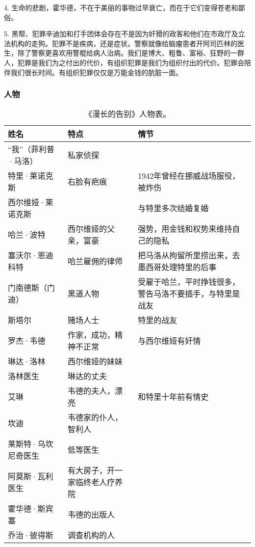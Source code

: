 4. 生命的悲剧，霍华德，不在于美丽的事物过早衰亡，而在于它们变得苍老和鄙俗。

5. 黑帮、犯罪辛迪加和打手团体会存在不是因为奸猾的政客和他们在市政厅及立法机构的走狗。犯罪不是疾病，还是症状。警察就像给脑瘤患者开阿司匹林的医生，除了警察更喜欢用警棍给病人治病。我们是博大、粗鲁、富裕、狂野的一群人，犯罪是我们为之付出的代价，有组织犯罪是我们为组织付出的代价。犯罪会陪伴我们很长时间。有组织犯罪仅仅是万能金钱的肮脏一面。

\subsubsection{人物}


\begin{table}[htpb]
\centering
\caption{《漫长的告别》人物表。}
\begin{tabular}{p{} | p{} | p{}}
姓名 & 特点 & 情节 \\
\hline
“我”（菲利普·马洛） & 私家侦探 &  \\
特里·莱诺克斯 &右脸有疤痕 &1942年曾经在挪威战场服役，被炸伤 \\
西尔维娅·莱诺克斯 & &  与特里多次结婚复婚 \\
哈兰·波特 & 西尔维娅的父亲，富豪 &强势，用金钱和权势来维持自己的隐私 \\
塞沃尔·恩迪科特 & 哈兰雇佣的律师 & 把马洛从拘留所里捞出来，去墨西哥处理特里的后事 \\
门南德斯（门迪） & 黑道人物 & 受雇于哈兰，平时挣钱很多，警告马洛不要插手，与特里是战友 \\
斯塔尔 &赌场人士 & 特里的战友 \\
罗杰·韦德 & 作家，成功，精神不正常&与西尔维娅有奸情 \\
琳达·洛林 & 西尔维娅的妹妹 & \\
洛林医生 & 琳达的丈夫 & \\
艾琳 &韦德的夫人，漂亮 & 和特里十年前有情史 \\
坎迪 & 韦德家的仆人，智利人 & \\
莱斯特·乌坎尼奇医生 &低等医生  & \\
阿莫斯·瓦利医生 &有大房子，开一家临终老人疗养院 & \\
霍华德·斯宾塞 & 韦德的出版人 & \\
乔治·彼得斯 & 调查机构的人 & \\
\hline
\end{tabular}

\end{table}

